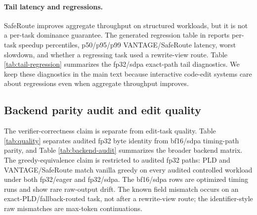 \documentclass[11pt,a4paper]{article}
\begin{document}
\paragraph{Tail latency and regressions.}
SafeRoute improves aggregate throughput on structured workloads, but it is
not a per-task dominance guarantee. The generated regression table in
reports per-task speedup percentiles, p50/p95/p99 VANTAGE/SafeRoute latency, worst
slowdown, and whether a regressing task used a rewrite-view route. Table
\ref{tab:tail-regression} summarizes the fp32/sdpa exact-path tail diagnostics.
We keep these diagnostics in the main text because interactive code-edit
systems care about regressions even when aggregate throughput improves.

\begin{table}[h]
\centering\scriptsize
\caption{Per-task tail and regression diagnostics against tuned PLD on the
same fp32/sdpa exact path as Table \ref{tab:frozen-headline}. Speedup ratios
are computed per task from generated-token tok/s. RewriteView-route regressions
count tasks with at least one rewrite-view route and per-task speedup below
1.}
\label{tab:tail-regression}
\end{table}


\subsection{Backend parity audit and edit quality}

The verifier-correctness claim is separate from edit-task quality.
Table \ref{tab:quality} separates audited fp32 byte identity from bf16/sdpa
timing-path parity, and Table \ref{tab:backend-audit} summarizes the broader
backend matrix. The greedy-equivalence claim is restricted to audited fp32
paths: PLD and VANTAGE/SafeRoute match vanilla greedy on every audited controlled
workload under both fp32/eager and fp32/sdpa. The bf16/sdpa rows are optimized
timing runs and show rare raw-output drift. The known field mismatch occurs on
an exact-PLD/fallback-routed task, not after a rewrite-view route; the identifier-style
raw mismatches are max-token continuations.
\end{document}
